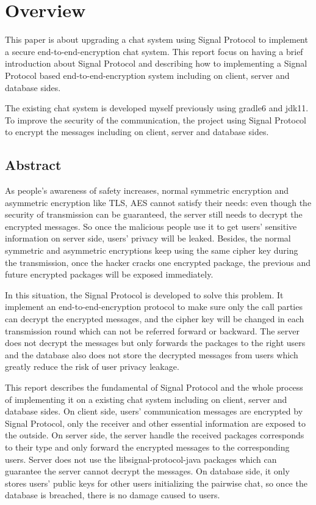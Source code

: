 \section{Overview}
This paper is about upgrading a chat system using Signal Protocol to implement a secure end-to-end-encryption chat system. This report focus on having a brief introduction about Signal Protocol and describing how to implementing a Signal Protocol based end-to-end-encryption system including on client, server and database sides.

The existing chat system is developed myself previously using gradle6 and jdk11. To improve the security of the communication, the project using Signal Protocol to encrypt the messages including on client, server and database sides.

\subsection{Abstract}
As people’s awareness of safety increases, normal symmetric encryption and asymmetric encryption like TLS, AES cannot satisfy their needs: even though the security of transmission can be guaranteed, the server still needs to decrypt the encrypted messages. So once the malicious people use it to get users' sensitive information on server side, users' privacy will be leaked. Besides, the normal symmetric and asymmetric encryptions keep  using the same cipher key during the transmission, once the hacker cracks one encrypted package, the previous and future encrypted packages will be exposed immediately.

In this situation, the Signal Protocol is developed to solve this problem. It implement an end-to-end-encryption protocol to make sure only the call parties can decrypt the encrypted messages, and the cipher key will be changed in each transmission round which can not be referred forward or backward. The server does not decrypt the messages but only forwards the packages to the right users and the database also does not store the decrypted messages from users which greatly reduce the risk of user privacy leakage.

This report describes the fundamental of Signal Protocol and the whole process of implementing it on a existing chat system including on client, server and database sides. On client side, users' communication messages are encrypted by Signal Protocol, only the receiver and other essential information are exposed to the outside. On server side, the server handle the received packages corresponds to their type and only forward the encrypted messages to the corresponding users. Server does not use the libsignal-protocol-java packages which can guarantee the server cannot decrypt the messages. On database side, it only stores users' public keys for other users initializing the pairwise chat, so once the database is breached, there is no damage caused to users.

